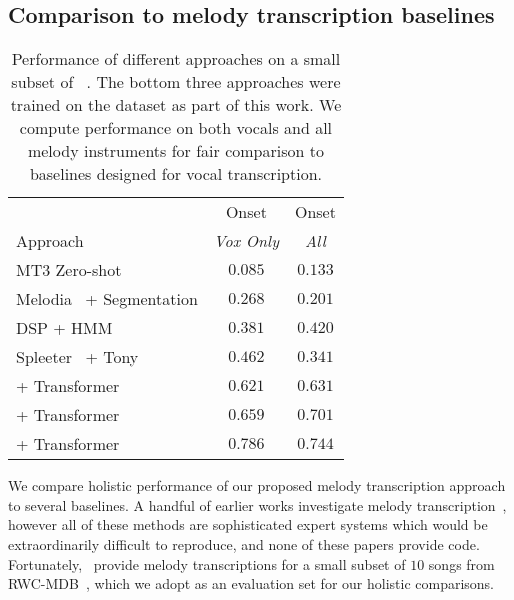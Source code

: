 \subsection{Comparison to melody transcription baselines}

\begin{table}[t]
    \centering
    \begin{tabular}{lcc}
\toprule
 & Onset \fone{} & Onset \fone{} \\
Approach & \emph{Vox Only} & \emph{All} \\
\midrule
MT3 Zero-shot~\cite{gardner2021mt3} & $0.085$ & $0.133$ \\
Melodia~\cite{salamon2014melody} + Segmentation & $0.268$ & $0.201$ \\
DSP + HMM~\cite{ryynanen2006transcription,ryynanen2008automatic} & $0.381$ & $0.420$ \\
Spleeter~\cite{hennequin2020spleeter} + Tony~\cite{mauch2015computer} & $0.462$ & $0.341$ \\
\midrule
\mel{} + Transformer & $0.621$ & $0.631$ \\
\mtthree{} + Transformer & $0.659$ & $0.701$ \\
\jukebox{} + Transformer & $\mathbf{0.786}$ & $\mathbf{0.744}$ \\
\bottomrule
    \end{tabular}
    \caption{Performance of different approaches on a small subset of \rwc~\cite{goto2002rwc,goto2003rwc,goto2004development}. The bottom three approaches were trained on the \hooktheory{} dataset as part of this work. We compute performance on both vocals and all melody instruments for fair comparison to baselines designed for vocal transcription.}
    \label{tab:rwc_ryy}
\end{table}

We compare holistic performance of our proposed melody transcription approach to several baselines. 
A handful of earlier works investigate melody transcription~\cite{ryynanen2008automatic,weil2009automatic,laaksonen2014automatic}, however all of these methods are sophisticated expert systems which would be extraordinarily difficult to reproduce, and none of these papers provide code. 
Fortunately,~\cite{ryynanen2008automatic} provide melody transcriptions for a small subset of $10$ songs from RWC-MDB~\cite{goto2002rwc,goto2003rwc,goto2004development}, 
which we adopt as an evaluation set for our holistic comparisons.

